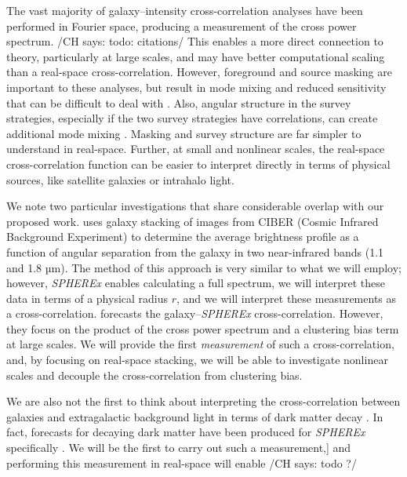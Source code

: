 \documentclass[12pt]{article}
\newcommand{\CH}[1]{{\color{blue!70!black} /CH says: #1/}}
\begin{document}
The vast majority of galaxy--intensity cross-correlation analyses have been performed in Fourier space, producing a measurement of the cross power spectrum. \CH{todo: citations}
This enables a more direct connection to theory, particularly at large scales, and may have better computational scaling than a real-space cross-correlation.
However, foreground and source masking are important to these analyses, but result in mode mixing and reduced sensitivity that can be difficult to deal with \citep{Cheng&Chang2022}.
Also, angular structure in the survey strategies, especially if the two survey strategies have correlations, can create additional mode mixing \citep{Dunne+2025}.
Masking and survey structure are far simpler to understand in real-space.
Further, at small and nonlinear scales, the real-space cross-correlation function can be easier to interpret directly in terms of physical sources, like satellite galaxies or intrahalo light.

We note two particular investigations that share considerable overlap with our proposed work.
\citet{Cheng+2021} uses galaxy stacking of images from CIBER (Cosmic Infrared Background Experiment) to determine the average brightness profile as a function of angular separation from the galaxy in two near-infrared bands (1.1 and 1.8 µm).
The method of this approach is very similar to what we will employ;
however, \textsl{SPHEREx} enables calculating a full spectrum, we will interpret these data in terms of a physical radius $r$, and we will interpret these measurements as a cross-correlation.
\citet{Cheng&Chang2022} forecasts the galaxy--\textsl{SPHEREx} cross-correlation.
However, they focus on the product of the cross power spectrum and a clustering bias term at large scales.
We will provide the first \textit{measurement} of such a cross-correlation, and, by focusing on real-space stacking, we will be able to investigate nonlinear scales and decouple the cross-correlation from clustering bias.

We are also not the first to think about interpreting the cross-correlation between galaxies and extragalactic background light in terms of dark matter decay \citep{Gong+2016axionsEBL}.
In fact, forecasts for decaying dark matter have been produced for \textsl{SPHEREx} specifically \citep{Shirasaki2021,Wu&Xia2025}.
We will be the first to carry out such a measurement,]
and performing this measurement in real-space will enable \CH{todo ?}
\end{document}
